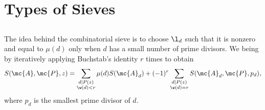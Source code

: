 \chapter{Types of Sieves}
  \section{}
    The idea behind the combinatorial sieve is to choose $\l_{d}$ such that it is nonzero and equal to $\mu(d)$ only when $d$ has a small number of prime divisors. We being by iteratively applying Buchstab's identity $r$ times to obtain
    \[
      S(\mc{A},\mc{P},z) = \sum_{\substack{d \mid P(z) \\ \w(d) < r}}\mu(d)S(\mc{A}_{d})+(-1)^{r}\sum_{\substack{d \mid P(z) \\ \w(d) = r}}S(\mc{A}_{d},\mc{P},p_{d}),
    \]
    where $p_{d}$ is the smallest prime divisor of $d$. 
  \section{}
  \section{}